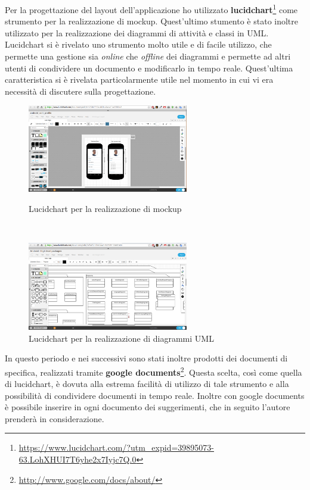 Per la progettazione del layout dell'applicazione ho utilizzato \textbf{lucidchart}\footnote{\url{https://www.lucidchart.com/?utm_expid=39895073-63.LohXHUI7T6yhe2x7Iyjc7Q.0}} come strumento per la realizzazione di \gls{mockup}. Quest'ultimo stumento è stato inoltre utilizzato per la realizzazione dei diagrammi di attività e classi in \gls{UML}. Lucidchart si è rivelato uno strumento molto utile e di facile utilizzo, che permette una gestione sia \textit{online} che \textit{offline} dei diagrammi e permette ad altri utenti di condividere un documento e modificarlo in tempo reale. Quest'ultima caratteristica si è rivelata particolarmente utile nel momento in cui vi era necessità di discutere sulla progettazione.

\begin{figure}
\begin{minipage}[b]{7cm}
\centering
\includegraphics[width=7cm]{../immagini/lucidchart-mockup}
\caption{Lucidchart per la realizzazione di mockup}
\end{minipage}
\ \hspace{2mm} \hspace{3mm} \
\begin{minipage}[b]{7cm}
\centering
\includegraphics[width=7cm]{../immagini/lucidchart-uml}
\caption{Lucidchart per la realizzazione di diagrammi UML}
\end{minipage}
\end{figure}

In questo periodo e nei successivi sono stati inoltre prodotti dei documenti di specifica, realizzati tramite \textbf{google documents}\footnote{\url{http://www.google.com/docs/about/}}. Questa scelta, così come quella di lucidchart, è dovuta alla estrema facilità di utilizzo di tale strumento e alla possibilità di condividere documenti in tempo reale. Inoltre con google documents è possibile inserire in ogni documento dei suggerimenti, che in seguito l'autore prenderà in considerazione.

